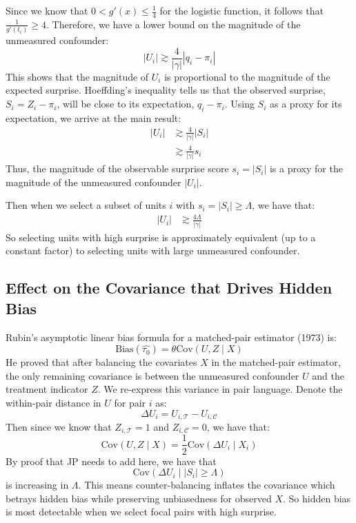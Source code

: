 \documentclass[12pt,letterpaper]{article}  %
\begin{document}
Since we know that $0 < g'(x) \leq \frac{1}{4}$ for the logistic function, it follows that $\frac{1}{g'(t_i)} \geq 4$. Therefore, we have a lower bound on the magnitude of the unmeasured confounder:
\begin{equation*}
    |U_i| \gtrsim \frac{4}{|\gamma|} |q_i - \pi_i|
\end{equation*}
This shows that the magnitude of $U_i$ is proportional to the magnitude of the expected surprise. Hoeffding's inequality tells us that the observed surprise, $S_i = Z_i - \pi_i$, will be close to its expectation, $q_i - \pi_i$. Using $S_i$ as a proxy for its expectation, we arrive at the main result:
\begin{align*}
    |U_i| &\gtrsim \frac{4}{|\gamma|} |S_i| \\
    &\gtrsim \frac{4}{|\gamma|} s_i
\end{align*}
Thus, the magnitude of the observable surprise score $s_i = |S_i|$ is a proxy for the magnitude of the unmeasured confounder $|U_i|$.

Then when we select a subset of units $i$ with $s_i = |S_i| \geq \Lambda$, we have that:
\begin{align*}
    |U_i| &\gtrsim \frac{4 \Lambda}{|\gamma|}
\end{align*}
So selecting units with high surprise is approximately equivalent (up to a constant factor) to selecting units with large unmeasured confounder.

\subsection*{Effect on the Covariance that Drives Hidden Bias}

Rubin's asymptotic linear bias formula for a matched-pair estimator (1973) is:
\begin{equation*}
    \text{Bias}(\widehat{\tau_0}) = \theta \text{Cov}(U, Z \mid X)
\end{equation*}
He proved that after balancing the covariates $X$ in the matched-pair estimator, the only remaining covariance is between the unmeasured confounder $U$ and the treatment indicator $Z$. We re-express this variance in pair language. Denote the within-pair distance in $U$ for pair $i$ as:
\begin{equation*}
    \Delta U_i = U_{i, \mathcal{T}} - U_{i, \mathcal{C}}
\end{equation*}
Then since we know that $Z_{i, \mathcal{T}} = 1$ and $Z_{i, \mathcal{C}} = 0$, we have that:
\begin{equation*}
    \text{Cov}(U, Z \mid X) = \frac{1}{2}\text{Cov}(\Delta U_i \mid X_i)
\end{equation*}
By proof that JP needs to add here, we have that
\begin{equation*}
    \text{Cov}(\Delta U_i \mid |S_i| \geq \Lambda)
\end{equation*}
is increasing in $\Lambda$. This means counter-balancing inflates the covariance which betrays hidden bias while preserving unbiasedness for observed $X$. So hidden bias is most detectable when we select focal pairs with high surprise.
\end{document}
